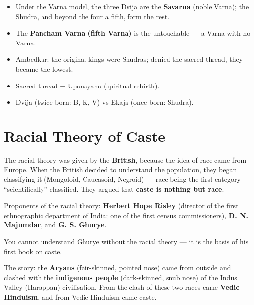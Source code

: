 \begin{itemize}
\item Under the Varna model, the three Dvija are the \textbf{Savarna} (noble Varna); the Shudra, and beyond the four a fifth, form the rest.
\item The \textbf{Pancham Varna (fifth Varna)} is the untouchable --- a Varna with no Varna.
\end{itemize}

\begin{QuickRevision}
\begin{itemize}
\item Ambedkar: the original kings were Shudras; denied the sacred thread, they became the lowest.
\item Sacred thread = Upanayana (spiritual rebirth).
\item Dvija (twice-born: B, K, V) vs Ekaja (once-born: Shudra).
\end{itemize}
\end{QuickRevision}

\section{Racial Theory of Caste}

The racial theory was given by the \textbf{British}, because the idea of race came from Europe. When the British decided to understand the population, they began classifying it (Mongoloid, Caucasoid, Negroid) --- race being the first category ``scientifically'' classified. They argued that \textbf{caste is nothing but race}.

\begin{DataFact}
Proponents of the racial theory: \textbf{Herbert Hope Risley} (director of the first ethnographic department of India; one of the first census commissioners), \textbf{D. N. Majumdar}, and \textbf{G. S. Ghurye}.
\end{DataFact}

\begin{CriticalPoint}
You cannot understand Ghurye without the racial theory --- it is the basis of his first book on caste.
\end{CriticalPoint}

The story: the \textbf{Aryans} (fair-skinned, pointed nose) came from outside and clashed with the \textbf{indigenous people} (dark-skinned, snub nose) of the Indus Valley (Harappan) civilisation. From the clash of these two races came \textbf{Vedic Hinduism}, and from Vedic Hinduism came caste.

